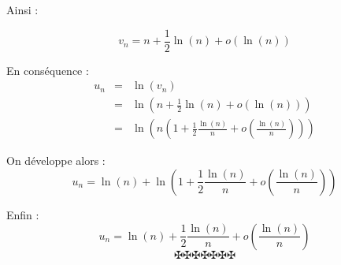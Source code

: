 Ainsi :


\[ v_n = n + \frac{1}{2} \ln (n) + o (\ln (n)) \]


En cons{\'e}quence :
\begin{eqnarray*}
  u_n & = & \ln (v_n)\\
  & = & \ln \left( n + \frac{1}{2} \ln (n) + o (\ln (n)) \right)\\
  & = & \ln \left( n \left( 1 + \frac{1}{2} \frac{\ln (n)}{n} + o \left(
  \frac{\ln (n)}{n} \right) \right) \right)
\end{eqnarray*}


On d{\'e}veloppe alors :
\[ u_n = \ln (n) + \ln \left( 1 + \frac{1}{2} \frac{\ln (n)}{n} + o \left(
   \frac{\ln (n)}{n} \right) \right) \]


Enfin :
\[ u_n = \ln (n) + \frac{1}{2} \frac{\ln (n)}{n} + o \left( \frac{\ln (n)}{n}
   \right) \]
\[ \maltese \maltese \maltese \maltese \maltese \maltese \maltese \]
